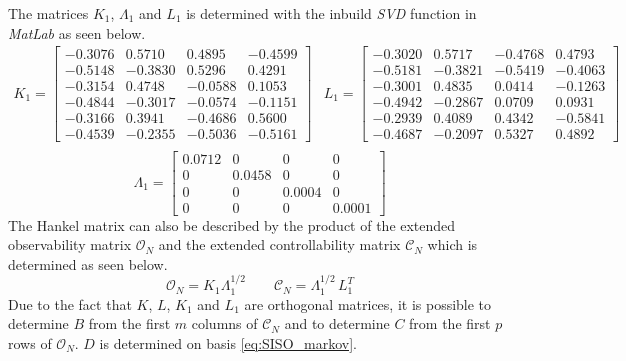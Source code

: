 The matrices $K_1$, $\Lambda_1$ and $L_1$ is determined with the inbuild \textit{SVD} function in \textit{MatLab} as seen below.
\begin{equation*}
    \begin{matrix}
        K_1=\begin{bmatrix}
            -0.3076 & 0.5710 & 0.4895 & -0.4599\\
            -0.5148 & -0.3830 & 0.5296 & 0.4291\\
            -0.3154 & 0.4748 & -0.0588 & 0.1053\\
            -0.4844 & -0.3017 & -0.0574 & -0.1151\\
            -0.3166 & 0.3941 & -0.4686 & 0.5600\\
            -0.4539 & -0.2355 & -0.5036 & -0.5161
        \end{bmatrix} &
        L_1=\begin{bmatrix}
            -0.3020 & 0.5717 & -0.4768 & 0.4793\\
            -0.5181 & -0.3821 & -0.5419 & -0.4063\\
            -0.3001 & 0.4835 & 0.0414 & -0.1263\\
            -0.4942 & -0.2867 & 0.0709 & 0.0931\\
            -0.2939 & 0.4089 & 0.4342 & -0.5841\\
            -0.4687 & -0.2097 & 0.5327 & 0.4892
        \end{bmatrix} \\
    \end{matrix}
\end{equation*}
\begin{equation}
    \Lambda_1=\begin{bmatrix}
    0.0712 & 0 & 0 & 0\\
    0 & 0.0458 & 0 & 0\\
    0 & 0 & 0.0004 & 0\\
    0 & 0 & 0 & 0.0001
    \end{bmatrix}
        \label{eq:K_L_Lambda}
\end{equation}
The Hankel matrix can also be described by the product of the extended observability matrix $\mathcal{O}_N$ and the extended controllability matrix $\mathcal{C}_N$ which is determined as seen below.
\begin{equation}
    \mathcal{O}_N=K_1\Lambda_1^{1/2} \qquad \mathcal{C}_N=\Lambda_1^{1/2}\,L_1^T
\end{equation}
Due to the fact that $K$, $L$, $K_1$ and $L_1$ are orthogonal matrices, it is possible to determine $B$ from the first $m$ columns of $\mathcal{C}_N$ and to determine $C$ from the first $p$ rows of $\mathcal{O}_N$. $D$ is determined on basis \cref{eq:SISO_markov}.
